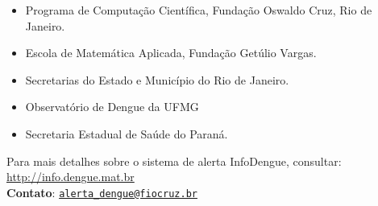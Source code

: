 \documentclass[10pt]{article} %
\begin{document}
\begin{minipage}[t]{1\linewidth}
\begin{itemize}
\item Programa de Computação Científica, Fundação Oswaldo Cruz, Rio de Janeiro.
\item Escola de Matemática Aplicada, Fundação Getúlio Vargas.
\item Secretarias do Estado e Município do Rio de Janeiro.
\item Observatório de Dengue da UFMG
\item Secretaria Estadual de Saúde do Paraná.
\end{itemize}

      \BackToContents %

\vspace{1cm}

\hline
Para mais detalhes sobre o sistema de alerta InfoDengue, consultar: \url{http://info.dengue.mat.br}\\

\textbf{Contato}: \href{alerta\_dengue@fiocruz.br}{\nolinkurl{alerta\_dengue@fiocruz.br} }
\end{minipage} %
\end{document}
